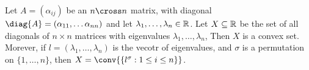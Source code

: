 \begin{theorem}\label{1.1.3}
    Let $A=(\alpha_{ij})$ be an  $n \cross n$ matrix, with diagonal $\diag{A}=(\alpha_{11}, \dots \alpha_{nn})$
    and let  $\lambda_1, \dots, \lambda_n \in \mathbb{R}$. Let $X \subseteq \mathbb{R}$ be the set of all diagonals of  $n \times n$ 
    \symmetric matrices with eigenvalues $\lambda_1, \dots, \lambda_n$, Then $X$ is a convex set. 
    Morever, if  $l=(\lambda_1, \dots, \lambda_n)$ is the vecotr of eigenvalues, and  $\sigma$ is 
    a permutation on  $\{1, \dots, n\}$, then $X=\conv{\{l^{\sigma}: 1 \leq i \leq n\}}$.
\end{theorem}
